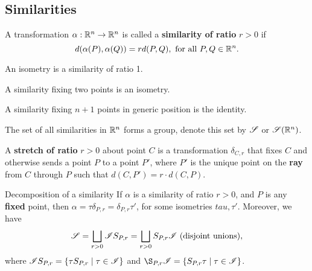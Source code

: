 \subsection{Similarities}

\begin{definition}
    A transformation \(\alpha: \mathbb{R}^n \to \mathbb{R}^n\) is called a \textbf{similarity of ratio} \(r > 0\) if \[d(\alpha(P), \alpha(Q)) = rd(P, Q), \text{ for all } P, Q \in \mathbb{R}^n.\]
\end{definition}

\begin{proposition}
    \begin{statements}{}
        \item An isometry is a similarity of ratio 1.
        \item A similarity fixing two points is an isometry.
        \item A similarity fixing \(n + 1\) points in generic position is the identity.
        \item The set of all similarities in \(\mathbb{R}^n\) forms a group, denote this set by \(\mathscr{S}\) or \(\mathscr{S}(\mathbb{R}^n)\).
    \end{statements}
\end{proposition}

\begin{definition}
    A \textbf{stretch of ratio} \(r > 0\) about point \(C\) is a transformation \(\delta_{C, r}\) that fixes \(C\) and otherwise sends a point \(P\) to a point \(P'\), where \(P'\) is the unique point on the \textbf{ray} from \(C\) through \(P\) such that \(d(C, P') = r \cdot d(C, P)\).
\end{definition}



\begin{theorem}{Decomposition of a similarity}
    If \(\alpha\) is a similarity of ratio \(r > 0\), and \(P\) is any \textbf{fixed} point, then \(\alpha = \tau\delta_{P, r} = \delta_{P, r}\tau'\), for some isometries \(tau, \tau'\). Moreover, we have
    \[\mathscr{S} = \bigsqcup_{r > 0} \mathscr{I} S_{P, r} = \bigsqcup_{r > 0} S_{P, r} \mathscr{I} \text{ (disjoint unions)},\]
    where \(\mathscr{I} S_{P, r} = \{\tau S_{P ,r } \mid \tau \in \mathscr{I} \}\) and \(\S_{P, r} \scrI = \{ S_{P, r} \tau \mid \tau \in \scrI\}\).
\end{theorem}

